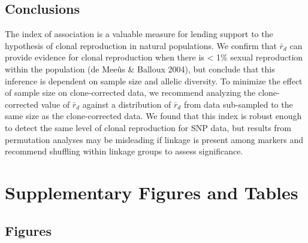 \documentclass[]{article}
\theoremstyle{definition}
\theoremstyle{definition}
\theoremstyle{definition}
\theoremstyle{remark}
\begin{document}
\subsection{Conclusions}\label{conclusions}

The index of association is a valuable measure for lending support to
the hypothesis of clonal reproduction in natural populations. We confirm
that \(\bar{r}_d\) can provide evidence for clonal reproduction when
there is \textless{} 1\% sexual reproduction within the population (de
Meeûs \& Balloux 2004), but conclude that this inference is dependent on
sample size and allelic diversity. To minimize the effect of sample size
on clone-corrected data, we recommend analyzing the clone-corrected
value of \(\bar{r}_d\) against a distribution of \(\bar{r}_d\) from data
sub-sampled to the same size as the clone-corrected data. We found that
this index is robust enough to detect the same level of clonal
reproduction for SNP data, but results from permutation analyses may be
misleading if linkage is present among markers and recommend shuffling
within linkage groups to assess significance.

\section{Supplementary Figures and
Tables}\label{supplementary-figures-and-tables}

\setcounter{figure}{0} \renewcommand{\thefigure}{S\arabic{figure}}

\subsection{Figures}\label{figures}
\end{document}
